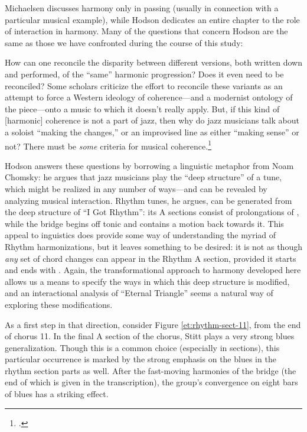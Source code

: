 Michaelsen discusses harmony only in passing (usually in connection with a
particular musical example), while Hodson dedicates an entire chapter to the
role of interaction in harmony. Many of the questions that concern
Hodson are the same as those we have confronted during the course of this study:
\begin{quoting}
  \singlespacing
  How can one reconcile the disparity between different versions, both written
  down and performed, of the ``same'' harmonic progression? Does it even need
  to be reconciled? Some scholars criticize the effort to reconcile these
  variants as an attempt to force a Western ideology of coherence---and a
  modernist ontology of the piece---onto a music to which it doesn't really
  apply. But, if this kind of [harmonic] coherence is not a part of jazz, then
  why do jazz musicians talk about a soloist ``making the changes,'' or an
  improvised line as either ``making sense'' or not? There must be \emph{some}
  criteria for musical coherence.\footcite[53]{hodson:2007}
\end{quoting}
%
Hodson answers these questions by borrowing a linguistic metaphor from Noam
Chomsky: he argues that jazz musicians play the ``deep structure'' of a tune,
which might be realized in any number of ways---and can be revealed by
analyzing musical interaction. Rhythm tunes, he argues, can be generated from
the deep structure of ``I Got Rhythm'': its A sections consist of
prolongations of \Bflat, while the bridge begins off tonic and contains a
motion back towards it. This appeal to inguistics does provide some way of
understanding the myriad of Rhythm harmonizations, but it leaves something to
be desired: it is not as though \emph{any} set of chord changes can appear in
the Rhythm A section, provided it starts and ends with \Bflat. Again, the
transformational approach to harmony developed here allows us a means to
specify the ways in which this deep structure is modified, and an
interactional analysis of ``Eternal Triangle'' seems a natural way of
exploring these modifications.

As a first step in that direction, consider Figure \ref{et:rhythm-sect-11},
from the end of chorus 11. In the final A section of the chorus, Stitt plays a
very strong blues generalization. Though this is a common choice (especially
in  sections), this particular occurrence is marked by the strong
emphasis on the blues in the rhythm section parts as well. After the
fast-moving harmonies of the bridge (the end of which is given in the
transcription), the group's convergence on eight bars of blues has a striking
effect.

